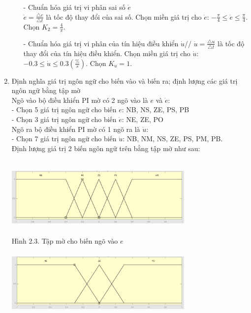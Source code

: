 \documentclass[a4paper, 12pt]{article}
\begin{document}
\begin{enumerate}
\begin{enumerate}
		\item[-] Chuẩn hóa giá trị vi phân sai số $\dot{e}$\\
		$\dot{e} = \frac{\triangle e}{\triangle t}$ là tốc độ thay đổi của sai số. Chọn miền giá trị cho $ \dot{e} $: $ -\frac{\pi}{4} \le \dot{e} \le \frac{\pi}{4} $. Chọn $K_{2} = \frac{4}{\pi}$.
		\item[-] Chuẩn hóa giá trị vi phân của tín hiệu điều khiển $\dot{u}$//
		$\dot{u} = \frac{\triangle u}{\triangle t}$ là tốc độ thay đổi của tín hiệu điều khiển. Chọn miền giá trị cho $\dot{u}$: $-0.3 \le \dot{u} \le 0.3 (\frac{\%}{s})$. Chọn $K_{u} = 1$.
	\end{enumerate}
	\item Định nghĩa giá trị ngôn ngữ cho biến vào và biến ra; định lượng các giá trị ngôn ngữ bằng tập mờ\\
	Ngõ vào bộ điều khiển PI mờ có 2 ngõ vào là $e$ và $\dot{e}$:\\
	- Chọn 5 giá trị ngôn ngữ cho biến $e$: NB, NS, ZE, PS, PB\\
	- Chọn 3 giá trị ngôn ngữ cho biến $\dot{e}$: NE, ZE, PO\\
	Ngõ ra bộ điều khiển PI mờ có 1 ngõ ra là $\dot{u}$:\\
	- Chọn 7 giá trị ngôn ngữ cho biến $\dot{u}$: NB, NM, NS, ZE, PS, PM, PB.\\
	Định lượng giá trị 2 biến ngôn ngữ trên bằng tập mờ như sau:\\\newpage
	\begin{center}
		\includegraphics[width=350px,height=150px]{images/efigure}\\
		Hình 2.3. Tập mờ cho biến ngõ vào $e$\\
		\vspace{0.5cm}
		\includegraphics[width=350px,height=150px]{images/edotfigure}\\

\end{center}
\end{enumerate}
\end{document}

